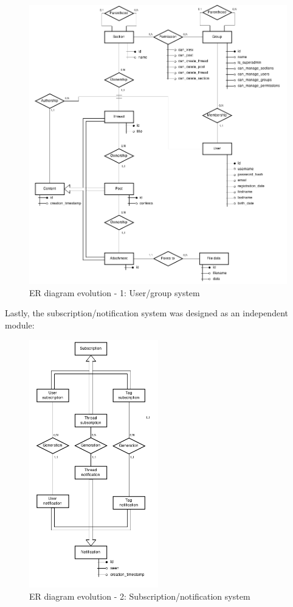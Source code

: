 \documentclass[12pt]{report}
\begin{document}
                \begin{figure}[H]
                \caption{ER diagram evolution - 1: User/group system}
                \centering
                \includegraphics[width=1\textwidth]{ernew/1}
                \end{figure}

                Lastly, the subscription/notification system was designed as an independent module: 

                \begin{figure}[H]
                \caption{ER diagram evolution - 2: Subscription/notification system}
                \centering
                \includegraphics[width=0.5\textwidth]{ernew/2}
                \end{figure}
\end{document}
